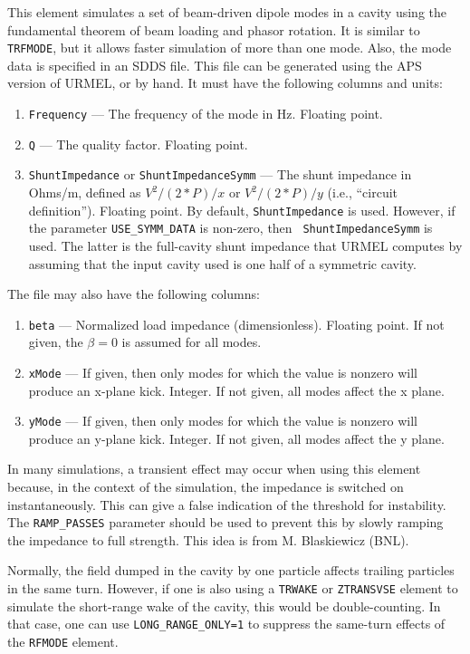 This element simulates a set of beam-driven dipole modes in a cavity using the fundamental theorem of beam loading and phasor rotation.
It is similar to {\tt TRFMODE}, but it allows faster simulation of more than
one mode.  Also, the mode data is specified in an SDDS file.  This file can be
generated using the APS version of URMEL, or by hand. It must have the following
columns and units:
\begin{enumerate}
\item {\tt Frequency} --- The frequency of the mode in Hz.  Floating point.
\item {\tt Q} --- The quality factor.  Floating point.
\item {\tt ShuntImpedance} or {\tt ShuntImpedanceSymm} --- The shunt
  impedance in Ohms/m, defined as $V^2/(2*P)/x$ or $V^2/(2*P)/y$ (i.e., ``circuit definition'').
  Floating point. By default, {\tt ShuntImpedance} is used.  However,
  if the parameter \verb|USE_SYMM_DATA| is non-zero, then {\tt
  ShuntImpedanceSymm} is used.  The latter is the full-cavity shunt
  impedance that URMEL computes by assuming that the input cavity used
  is one half of a symmetric cavity.
\end{enumerate}

The file may also have the following columns:
\begin{enumerate}
\item {\tt beta} --- Normalized load impedance (dimensionless).  Floating point. If not given, the
 $\beta=0$ is assumed for all modes. 
\item {\tt xMode} --- If given, then only modes for which the value is nonzero will produce an
 x-plane kick.  Integer.  If not given, all modes affect the x plane.
\item {\tt yMode} --- If given, then only modes for which the value is nonzero will produce an
 y-plane kick.  Integer.  If not given, all modes affect the y plane.
\end{enumerate}
    
In many simulations, a transient effect may occur when using this
element because, in the context of the simulation, the impedance is
switched on instantaneously.  This can give a false indication of the
threshold for instability. The {\tt RAMP\_PASSES} parameter should
be used to prevent this by slowly ramping the impedance to full
strength.  This idea is from M. Blaskiewicz (BNL).

Normally, the field dumped in the cavity by one particle affects trailing particles in the same turn.
However, if one is also using a \verb|TRWAKE| or \verb|ZTRANSVSE| element to simulate the short-range wake of the cavity, this would be double-counting.
In that case, one can use \verb|LONG_RANGE_ONLY=1| to suppress the same-turn effects of the \verb|RFMODE| element.
